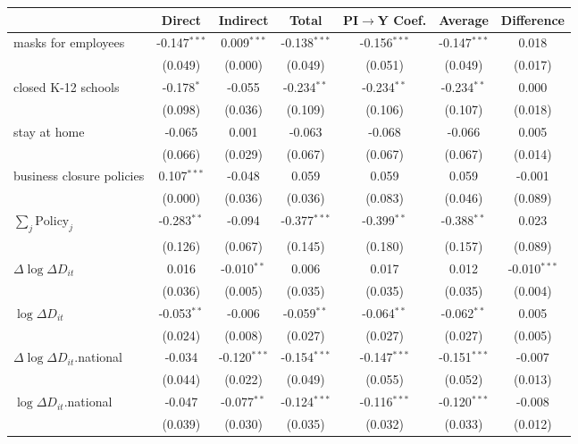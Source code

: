 
\begin{tabular}{lccccc|>{}c}
\toprule
  & Direct & Indirect & Total & PI$\to$Y Coef. & Average & Difference\\
\midrule
masks for employees & -0.147$^{***}$ & 0.009$^{***}$ & -0.138$^{***}$ & -0.156$^{***}$ & -0.147$^{***}$ & 0.018\\
 & (0.049) & (0.000) & (0.049) & (0.051) & (0.049) & (0.017)\\
closed K-12 schools & -0.178$^{*}$ & -0.055 & -0.234$^{**}$ & -0.234$^{**}$ & -0.234$^{**}$ & 0.000\\
 & (0.098) & (0.036) & (0.109) & (0.106) & (0.107) & (0.018)\\
stay at home & -0.065 & 0.001 & -0.063 & -0.068 & -0.066 & 0.005\\
 & (0.066) & (0.029) & (0.067) & (0.067) & (0.067) & (0.014)\\
business closure policies & 0.107$^{***}$ & -0.048 & 0.059 & 0.059 & 0.059 & -0.001\\
 & (0.000) & (0.036) & (0.036) & (0.083) & (0.046) & (0.089)\\
$\sum_j \mathrm{Policy}_j$ & -0.283$^{**}$ & -0.094 & -0.377$^{***}$ & -0.399$^{**}$ & -0.388$^{**}$ & 0.023\\
 & (0.126) & (0.067) & (0.145) & (0.180) & (0.157) & (0.089)\\
$\Delta \log \Delta D_{it}$ & 0.016 & -0.010$^{**}$ & 0.006 & 0.017 & 0.012 & -0.010$^{***}$\\
 & (0.036) & (0.005) & (0.035) & (0.035) & (0.035) & (0.004)\\
$\log \Delta D_{it}$ & -0.053$^{**}$ & -0.006 & -0.059$^{**}$ & -0.064$^{**}$ & -0.062$^{**}$ & 0.005\\
 & (0.024) & (0.008) & (0.027) & (0.027) & (0.027) & (0.005)\\
$\Delta \log \Delta D_{it}$.national & -0.034 & -0.120$^{***}$ & -0.154$^{***}$ & -0.147$^{***}$ & -0.151$^{***}$ & -0.007\\
 & (0.044) & (0.022) & (0.049) & (0.055) & (0.052) & (0.013)\\
$\log \Delta D_{it}$.national & -0.047 & -0.077$^{**}$ & -0.124$^{***}$ & -0.116$^{***}$ & -0.120$^{***}$ & -0.008\\
 & (0.039) & (0.030) & (0.035) & (0.032) & (0.033) & (0.012)\\
\bottomrule
\end{tabular}